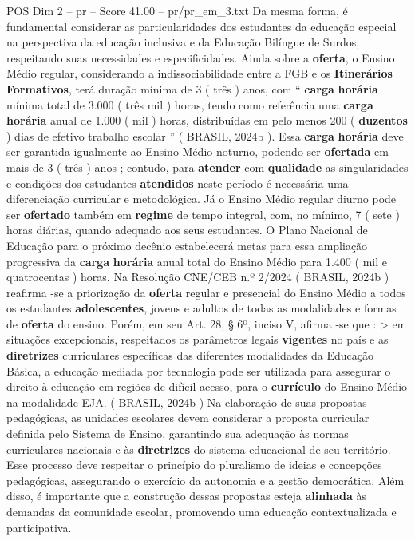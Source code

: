 \begin{textsample}{POS Dim 2 – pr – Score 41.00 – pr/pr\_em\_3.txt}
Da mesma forma, é fundamental considerar as particularidades dos estudantes da educação especial na perspectiva da educação inclusiva e da Educação Bilíngue de Surdos, respeitando suas necessidades e especificidades.
Ainda sobre a \textbf{oferta}, o Ensino Médio regular, considerando a indissociabilidade entre a FGB e os \textbf{Itinerários} \textbf{Formativos}, terá duração mínima de 3 ( três ) anos, com “ \textbf{carga} \textbf{horária} mínima total de 3.000 ( três mil ) horas, tendo como referência uma \textbf{carga} \textbf{horária} anual de 1.000 ( mil ) horas, distribuídas em pelo menos 200 ( \textbf{duzentos} ) dias de efetivo trabalho escolar ” ( BRASIL, 2024b ).
Essa \textbf{carga} \textbf{horária} deve ser garantida igualmente ao Ensino Médio noturno, podendo ser \textbf{ofertada} em mais de 3 ( três ) anos ; contudo, para \textbf{atender} com \textbf{qualidade} as singularidades e condições dos estudantes \textbf{atendidos} neste período é necessária uma diferenciação curricular e metodológica.
Já o Ensino Médio regular diurno pode ser \textbf{ofertado} também em \textbf{regime} de tempo integral, com, no mínimo, 7 ( sete ) horas diárias, quando adequado aos seus estudantes.
O Plano Nacional de Educação para o próximo decênio estabelecerá metas para essa ampliação progressiva da \textbf{carga} \textbf{horária} anual total do Ensino Médio para 1.400 ( mil e quatrocentas ) horas.
Na Resolução CNE/CEB n.º 2/2024 ( BRASIL, 2024b ) reafirma -se a priorização da \textbf{oferta} regular e presencial do Ensino Médio a todos os estudantes \textbf{adolescentes}, jovens e adultos de todas as modalidades e formas de \textbf{oferta} do ensino.
Porém, em seu Art. 28, § 6º, inciso V, afirma -se que : > em situações excepcionais, respeitados os parâmetros legais \textbf{vigentes} no país e as \textbf{diretrizes} curriculares específicas das diferentes modalidades da Educação Básica, a educação mediada por tecnologia pode ser utilizada para assegurar o direito à educação em regiões de difícil acesso, para o \textbf{currículo} do Ensino Médio na modalidade EJA. ( BRASIL, 2024b ) Na elaboração de suas propostas pedagógicas, as unidades escolares devem considerar a proposta curricular definida pelo Sistema de Ensino, garantindo sua adequação às normas curriculares nacionais e às \textbf{diretrizes} do sistema educacional de seu território.
Esse processo deve respeitar o princípio do pluralismo de ideias e concepções pedagógicas, assegurando o exercício da autonomia e a gestão democrática.
Além disso, é importante que a construção dessas propostas esteja \textbf{alinhada} às demandas da comunidade escolar, promovendo uma educação contextualizada e participativa.

\end{textsample}
